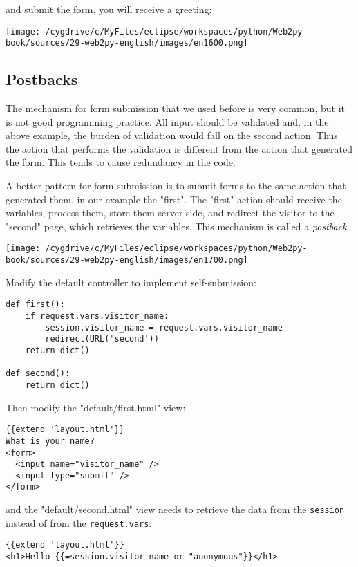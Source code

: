 \documentclass[justified,sixbynine,notoc]{tufte-book}
\def\ft{\small\tt}
\def\inxx#1{\index{#1}}
\begin{document}
\begin{fullwidth}
\noindent and submit the form, you will receive a greeting:


\goodbreak\begin{center}\texttt{[image: /cygdrive/c/MyFiles/eclipse/workspaces/python/Web2py-book/sources/29-web2py-english/images/en1600.png]}\end{center}


\goodbreak\subsection{Postbacks}

\inxx{redirect} \inxx{URL} \inxx{postback}

The mechanism for form submission that we used before is very common, but it is not good programming practice. All input should be validated and, in the above example, the burden of validation would fall on the second action. Thus the action that performs the validation is different from the action that generated the form. This tends to cause redundancy in the code.

A better pattern for form submission is to submit forms to the same action that generated them, in our example the "first". The "first" action should receive the variables, process them, store them server-side, and redirect the visitor to the "second" page, which retrieves the variables. This mechanism is called a {\it postback}.


\goodbreak\begin{center}\texttt{[image: /cygdrive/c/MyFiles/eclipse/workspaces/python/Web2py-book/sources/29-web2py-english/images/en1700.png]}\end{center}


Modify the default controller to implement self-submission:
\begin{lstlisting}
def first():
    if request.vars.visitor_name:
        session.visitor_name = request.vars.visitor_name
        redirect(URL('second'))
    return dict()

def second():
    return dict()
\end{lstlisting}

Then modify the "default/first.html" view:
\begin{lstlisting}[keywords={}]
{{extend 'layout.html'}}
What is your name?
<form>
  <input name="visitor_name" />
  <input type="submit" />
</form>
\end{lstlisting}
\noindent and the "default/second.html" view needs to retrieve the data from the {\ft session} instead of from the {\ft request.vars}:
\begin{lstlisting}[keywords={}]
{{extend 'layout.html'}}
<h1>Hello {{=session.visitor_name or "anonymous"}}</h1>
\end{lstlisting}


\end{fullwidth}
\end{document}
